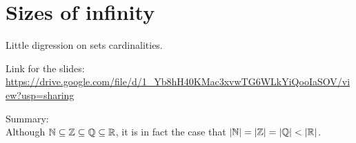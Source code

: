 \section{Sizes of infinity}
Little digression on sets cardinalities.

Link for the slides:\\
\url{https://drive.google.com/file/d/1_Yb8hH40KMac3xvwTG6WLkYiQooIaSOV/view?usp=sharing}

Summary:\\
Although $\mathbb{N} \subseteq \mathbb{Z} \subseteq \mathbb{Q} \subseteq \mathbb{R}$, it is in fact the case that $| \mathbb{N} | = | \mathbb{Z} | = | \mathbb{Q} | < | \mathbb{R} |$.
